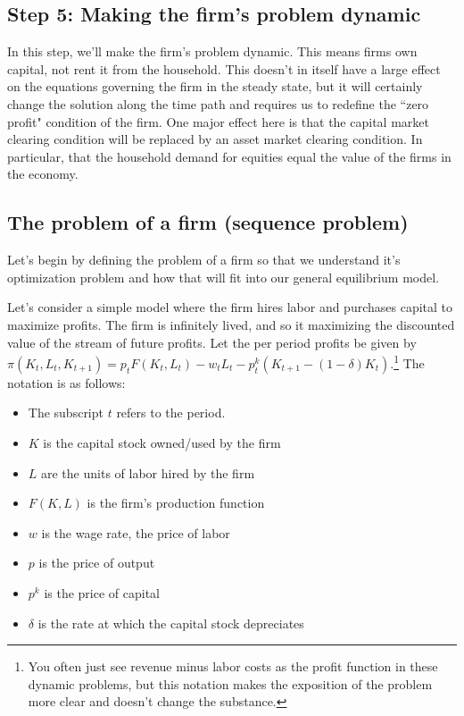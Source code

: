 \documentclass[letterpaper,12pt]{article}
\theoremstyle{definition}
\begin{document}
\begin{spacing}{1.5}
\section*{Step 5: Making the firm's problem dynamic}

In this step, we'll make the firm's problem dynamic. This means firms own capital, not rent it from the household.  This doesn't in itself have a large effect on the equations governing the firm in the steady state, but it will certainly change the solution along the time path and requires us to redefine the ``zero profit" condition of the firm. One major effect here is that the capital market clearing condition will be replaced by an asset market clearing condition.  In particular, that the household demand for equities equal the value of the firms in the economy.

\subsection*{The problem of a firm (sequence problem)}

Let's begin by defining the problem of a firm so that we understand it's optimization problem and how that will fit into our general equilibrium model.

Let's consider a simple model where the firm hires labor and purchases capital to maximize profits.  The firm is infinitely lived, and so it maximizing the discounted value of the stream of future profits.  Let the per period profits be given by $\pi(K_{t},L_{t},K_{t+1}) = p_{t}F(K_{t},L_{t}) - w_{t}L_{t} - p^{k}_{t}(K_{t+1} - (1-\delta)K_{t})$.\footnote{You often just see revenue minus labor costs as the profit function in these dynamic problems, but this notation makes the exposition of the problem more clear and doesn't change the substance.}  The notation is as follows:
\begin{itemize}
\item The subscript $t$ refers to the period. 
\item $K$ is the capital stock owned/used by the firm
\item $L$ are the units of labor hired by the firm
\item $F(K,L)$ is the firm's production function
\item $w$ is the wage rate, the price of labor
\item $p$ is the price of output
\item $p^{k}$ is the price of capital
\item $\delta$ is the rate at which the capital stock depreciates
\end{itemize}


\end{spacing}
\end{document}
